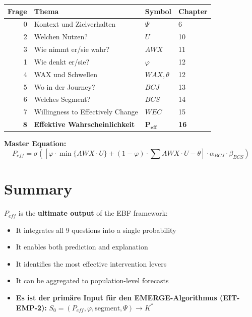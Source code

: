 \begin{center}
\begin{tcolorbox}[
  title={\textbf{EBF: Die 9 Fragen — Vollständig beantwortet}},
  colback=green!5,
  colframe=green!40!black,
  width=0.95\textwidth
]
\small
\begin{tabular}{rlll}
\textbf{Frage} & \textbf{Thema} & \textbf{Symbol} & \textbf{Chapter} \\
\midrule
0 & Kontext und Zielverhalten & $\Psi$ & 6 \\
2 & Welchen Nutzen? & $U$ & 10 \\
3 & Wie nimmt er/sie wahr? & $AWX$ & 11 \\
1 & Wie denkt er/sie? & $\varphi$ & 12 \\
4 & WAX und Schwellen & $WAX, \theta$ & 12 \\
5 & Wo in der Journey? & $BCJ$ & 13 \\
6 & Welches Segment? & $BCS$ & 14 \\
7 & Willingness to Effectively Change & $WEC$ & 15 \\
\textbf{8} & \textbf{Effektive Wahrscheinlichkeit} & $\mathbf{P_{eff}}$ & \textbf{16} \\
\end{tabular}

\vspace{6pt}

\textbf{Master Equation:}
\[
P_{eff} = \sigma\left(
    \left[\varphi \cdot \min\{AWX \cdot U\} + (1-\varphi) \cdot \sum AWX \cdot U - \theta\right]
    \cdot \alpha_{BCJ} \cdot \beta_{BCS}
\right)
\]
\end{tcolorbox}
\end{center}

\section{Summary}

$P_{eff}$ is the \textbf{ultimate output} of the EBF framework:
\begin{itemize}
    \item It integrates all 9 questions into a single probability
    \item It enables both prediction and explanation
    \item It identifies the most effective intervention levers
    \item It can be aggregated to population-level forecasts
    \item \textbf{Es ist der primäre Input für den EMERGE-Algorithmus (EIT-EMP-2):} $S_0 = (P_{eff}, \varphi, \text{segment}, \Psi) \to K^*$
\end{itemize}

